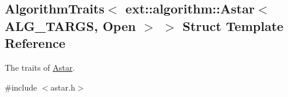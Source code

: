 \hypertarget{structAlgorithmTraits_3_01ext_1_1algorithm_1_1Astar_3_01ALG__TARGS_00_01Open_01_4_01_4}{}\subsection{Algorithm\+Traits$<$ ext\+:\+:algorithm\+:\+:Astar$<$ A\+L\+G\+\_\+\+T\+A\+R\+GS, Open $>$ $>$ Struct Template Reference}
\label{structAlgorithmTraits_3_01ext_1_1algorithm_1_1Astar_3_01ALG__TARGS_00_01Open_01_4_01_4}


The traits of \hyperlink{structAstar}{Astar}.  




{\ttfamily \#include $<$astar.\+h$>$}


